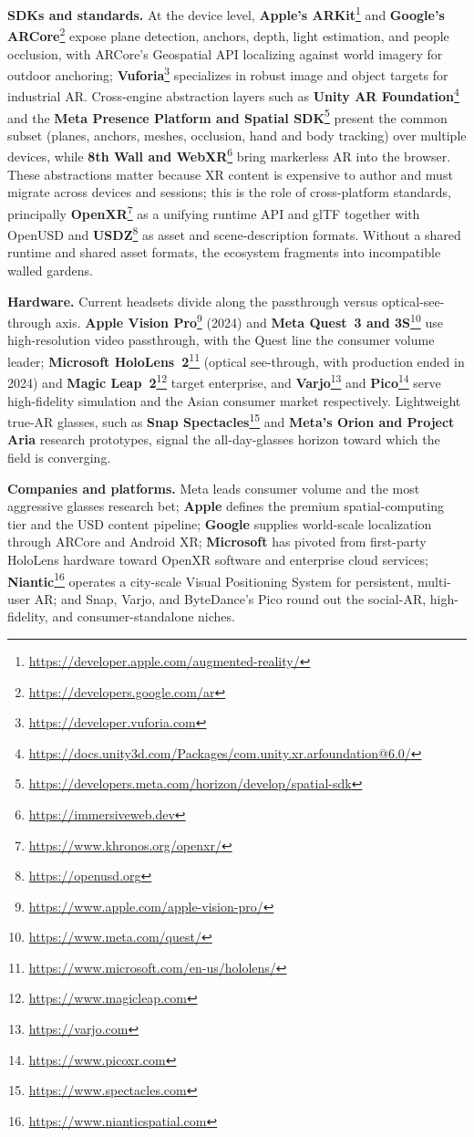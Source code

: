 \textbf{SDKs and standards.} At the device level, \textbf{Apple's ARKit}\footnote{\url{https://developer.apple.com/augmented-reality/}} and \textbf{Google's ARCore}\footnote{\url{https://developers.google.com/ar}} expose plane detection, anchors, depth, light estimation, and people occlusion, with ARCore's Geospatial API localizing against world imagery for outdoor anchoring; \textbf{Vuforia}\footnote{\url{https://developer.vuforia.com}} specializes in robust image and object targets for industrial AR. 
Cross-engine abstraction layers such as \textbf{Unity AR Foundation}\footnote{\url{https://docs.unity3d.com/Packages/com.unity.xr.arfoundation@6.0/}} and the \textbf{Meta Presence Platform and Spatial SDK}\footnote{\url{https://developers.meta.com/horizon/develop/spatial-sdk}} present the common subset (planes, anchors, meshes, occlusion, hand and body tracking) over multiple devices, while \textbf{8th Wall and WebXR}\footnote{\url{https://immersiveweb.dev}} bring markerless AR into the browser. These abstractions matter because XR content is expensive to author and must migrate across devices and sessions; this is the role of cross-platform standards, principally \textbf{OpenXR}\footnote{\url{https://www.khronos.org/openxr/}} as a unifying runtime API and glTF together with OpenUSD and \textbf{USDZ}\footnote{\url{https://openusd.org}} as asset and scene-description formats. Without a shared runtime and shared asset formats, the ecosystem fragments into incompatible walled gardens.

\textbf{Hardware.} Current headsets divide along the passthrough versus optical-see-through axis. 
\textbf{Apple Vision Pro}\footnote{\url{https://www.apple.com/apple-vision-pro/}} (2024) and \textbf{Meta Quest~3 and 3S}\footnote{\url{https://www.meta.com/quest/}} use high-resolution video passthrough, with the Quest line the consumer volume leader; \textbf{Microsoft HoloLens~2}\footnote{\url{https://www.microsoft.com/en-us/hololens/}} (optical see-through, with production ended in 2024) and \textbf{Magic Leap~2}\footnote{\url{https://www.magicleap.com}} target enterprise, and \textbf{Varjo}\footnote{\url{https://varjo.com}} and \textbf{Pico}\footnote{\url{https://www.picoxr.com}} serve high-fidelity simulation and the Asian consumer market respectively. 
Lightweight true-AR glasses, such as \textbf{Snap Spectacles}\footnote{\url{https://www.spectacles.com}} and \textbf{Meta's Orion and Project Aria} research prototypes, signal the all-day-glasses horizon toward which the field is converging.

\textbf{Companies and platforms.} Meta leads consumer volume and the most aggressive glasses research bet; 
\textbf{Apple} defines the premium spatial-computing tier and the USD content pipeline; \textbf{Google} supplies world-scale localization through ARCore and Android XR; \textbf{Microsoft} has pivoted from first-party HoloLens hardware toward OpenXR software and enterprise cloud services; \textbf{Niantic}\footnote{\url{https://www.nianticspatial.com}} operates a city-scale Visual Positioning System for persistent, multi-user AR; and Snap, Varjo, and ByteDance's Pico round out the social-AR, high-fidelity, and consumer-standalone niches.

